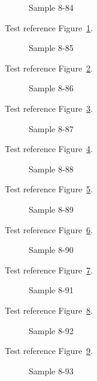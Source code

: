 \begin{figure}[tbhp]
\caption{Sample 8-84}
\label{fig:sample-8-84}
\end{figure}

Test reference Figure~\ref{fig:sample-8-84}.

\begin{figure}[tbhp]
\caption{Sample 8-85}
\label{fig:sample-8-85}
\end{figure}

Test reference Figure~\ref{fig:sample-8-85}.

\begin{figure}[tbhp]
\caption{Sample 8-86}
\label{fig:sample-8-86}
\end{figure}

Test reference Figure~\ref{fig:sample-8-86}.

\begin{figure}[tbhp]
\caption{Sample 8-87}
\label{fig:sample-8-87}
\end{figure}

Test reference Figure~\ref{fig:sample-8-87}.

\begin{figure}[tbhp]
\caption{Sample 8-88}
\label{fig:sample-8-88}
\end{figure}

Test reference Figure~\ref{fig:sample-8-88}.

\begin{figure}[tbhp]
\caption{Sample 8-89}
\label{fig:sample-8-89}
\end{figure}

Test reference Figure~\ref{fig:sample-8-89}.

\begin{figure}[tbhp]
\caption{Sample 8-90}
\label{fig:sample-8-90}
\end{figure}

Test reference Figure~\ref{fig:sample-8-90}.

\begin{figure}[tbhp]
\caption{Sample 8-91}
\label{fig:sample-8-91}
\end{figure}

Test reference Figure~\ref{fig:sample-8-91}.

\begin{figure}[tbhp]
\caption{Sample 8-92}
\label{fig:sample-8-92}
\end{figure}

Test reference Figure~\ref{fig:sample-8-92}.

\begin{figure}[tbhp]
\caption{Sample 8-93}
\label{fig:sample-8-93}
\end{figure}


